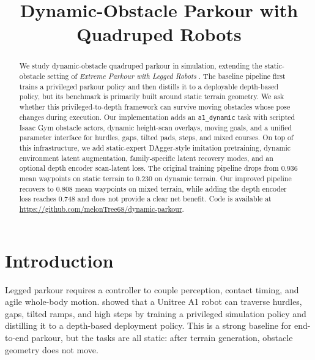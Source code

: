 \documentclass[conference]{IEEEtran}
\begin{document}
\title{Dynamic-Obstacle Parkour with Quadruped Robots}

\author{
	\and
}

\maketitle

\begin{abstract}
	We study dynamic-obstacle quadruped parkour in simulation, extending the static-obstacle setting of \emph{Extreme Parkour with Legged Robots} \citep{cheng2023parkour}. The baseline pipeline first trains a privileged parkour policy and then distills it to a deployable depth-based policy, but its benchmark is primarily built around static terrain geometry. We ask whether this privileged-to-depth framework can survive moving obstacles whose pose changes during execution. Our implementation adds an \texttt{a1\_dynamic} task with scripted Isaac Gym obstacle actors, dynamic height-scan overlays, moving goals, and a unified parameter interface for hurdles, gaps, tilted pads, steps, and mixed courses. On top of this infrastructure, we add static-expert DAgger-style imitation pretraining, dynamic environment latent augmentation, family-specific latent recovery modes, and an optional depth encoder scan-latent loss. The original training pipeline drops from \(0.936\) mean waypoints on static terrain to \(0.230\) on dynamic terrain. Our improved pipeline recovers to \(0.808\) mean waypoints on mixed terrain, while adding the depth encoder loss reaches \(0.748\) and does not provide a clear net benefit. Code is available at \url{https://github.com/melonTree68/dynamic-parkour}.
\end{abstract}

\IEEEpeerreviewmaketitle

\section{Introduction}
Legged parkour requires a controller to couple perception, contact timing, and agile whole-body motion. \citet{cheng2023parkour} showed that a Unitree A1 robot can traverse hurdles, gaps, tilted ramps, and high steps by training a privileged simulation policy and distilling it to a depth-based deployment policy. This is a strong baseline for end-to-end parkour, but the tasks are all static: after terrain generation, obstacle geometry does not move.
\end{document}
